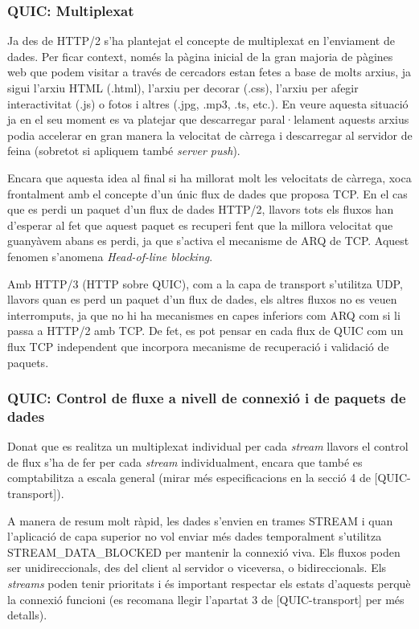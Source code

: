 \subsubsection{QUIC: Multiplexat}
{
    Ja des de HTTP/2 s'ha plantejat el concepte de multiplexat en l'enviament de dades. Per ficar context, només la pàgina inicial de la gran
    majoria de pàgines web que podem visitar a través de cercadors estan fetes a base de molts arxius, ja sigui l'arxiu HTML (.html),
    l'arxiu per decorar (.css), l'arxiu per afegir interactivitat (.js) o fotos i altres (.jpg, .mp3, .ts, etc.). En veure aquesta situació
    ja en el seu moment es va platejar que descarregar paral·lelament aquests arxius podia accelerar en gran manera la velocitat de càrrega i
    descarregar al servidor de feina (sobretot si apliquem també \textit{server push}).
    
    Encara que aquesta idea al final si ha millorat molt les velocitats de càrrega, xoca frontalment amb el concepte d'un únic flux de dades
    que proposa TCP. En el cas que es perdi un paquet d'un flux de dades HTTP/2, llavors tots els fluxos han d'esperar al fet que aquest paquet
    es recuperi fent que la millora velocitat que guanyàvem abans es perdi, ja que s'activa el mecanisme de ARQ de TCP. Aquest fenomen s'anomena
    \textit{Head-of-line blocking}.
    
    Amb HTTP/3 (HTTP sobre QUIC), com a la capa de transport s'utilitza UDP, llavors quan es perd un paquet d'un flux de dades, els altres fluxos
    no es veuen interromputs, ja que no hi ha mecanismes en capes inferiors com ARQ com si li passa a HTTP/2 amb TCP. De fet, es pot pensar en cada
    flux de QUIC com un flux TCP independent que incorpora mecanisme de recuperació i validació de paquets.
}

\subsubsection{QUIC: Control de fluxe a nivell de connexió i de paquets de dades}
{
    Donat que es realitza un multiplexat individual per cada \textit{stream} llavors el control de flux s'ha de fer per cada \textit{stream}
    individualment, encara que també es comptabilitza a escala general (mirar més especificacions en la secció 4 de [QUIC-transport]).
    
    A manera de resum molt ràpid, les dades s'envien en trames STREAM i quan l'aplicació de capa superior no vol enviar més dades temporalment s'utilitza
    STREAM\_DATA\_BLOCKED per mantenir la connexió viva. Els fluxos poden ser unidireccionals, des del client al servidor o viceversa, o bidireccionals.
    Els \textit{streams} poden tenir prioritats i és important respectar els estats d'aquests perquè la connexió funcioni (es recomana llegir l'apartat
    3 de [QUIC-transport] per més detalls).
}

